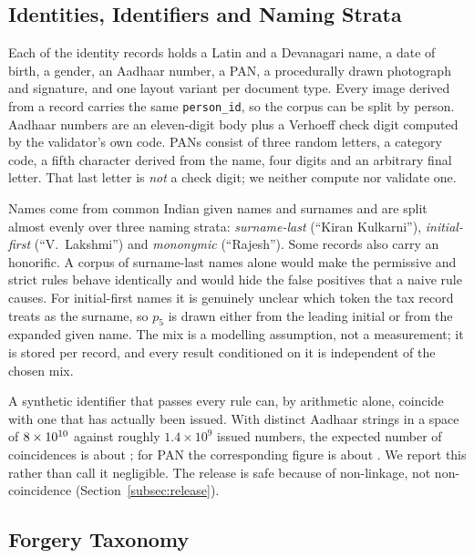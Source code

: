 \documentclass[conference]{IEEEtran}
\begin{document}
\subsection{Identities, Identifiers and Naming Strata}
\label{subsec:records}
\label{subsec:identifiers}

Each of the \dsPersons{} identity records holds a Latin and a
Devanagari name, a date of birth, a gender, an Aadhaar number, a PAN, a
procedurally drawn photograph and signature, and one layout variant per
document type. Every image derived from a record carries the same
\texttt{person\_id}, so the corpus can be split by person.
Aadhaar numbers are an eleven-digit body plus a Verhoeff check digit
computed by the validator's own code. PANs consist of three random
letters, a category code, a fifth character derived from the name, four
digits and an arbitrary final letter. That last letter is \emph{not} a
check digit; we neither compute nor validate one.

Names come from common Indian given names and surnames and are split
almost evenly over three naming strata: \emph{surname-last}
(``Kiran Kulkarni''), \emph{initial-first} (``V.~Lakshmi'') and
\emph{mononymic} (``Rajesh''). Some records also carry an honorific. A
corpus of surname-last names alone would make the permissive and strict
rules behave identically and would hide the false positives that a
naive rule causes. For initial-first names it is genuinely unclear which
token the tax record treats as the surname, so $p_5$ is drawn either
from the leading initial or from the expanded given name. The mix is a
modelling assumption, not a measurement; it is stored per record, and
every result conditioned on it is independent of the chosen mix.

A synthetic identifier that passes every rule can, by arithmetic alone,
coincide with one that has actually been issued. With \dsAadhaarStrings{}
distinct Aadhaar strings in a space of $8\times10^{10}$ against roughly
$1.4\times10^9$ issued numbers, the expected number of coincidences is
about \dsAadhaarCoinExp{}; for PAN the corresponding figure is about
\dsPanCoinExp{}. We report this rather than call it negligible. The
release is safe because of non-linkage, not non-coincidence
(Section~\ref{subsec:release}).

\subsection{Forgery Taxonomy}
\label{subsec:taxonomy}
\end{document}
